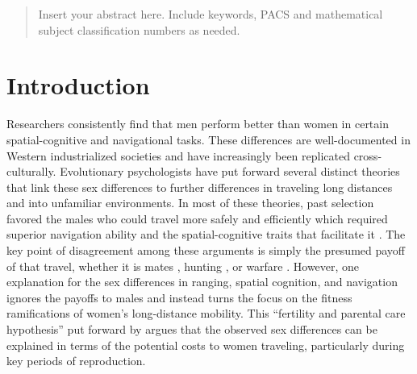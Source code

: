 
\date{Received: date / Accepted: date}


\maketitle

\begin{abstract}
Insert your abstract here. Include keywords, PACS and mathematical
subject classification numbers as needed.
\end{abstract}

\section{Introduction}
\label{sec:1}
Researchers consistently find  that men perform better than women in certain spatial-cognitive and navigational tasks.  These differences are well-documented in Western industrialized societies and have increasingly been replicated cross-culturally.  Evolutionary psychologists have put forward several distinct theories that link these sex differences to further differences in traveling long distances and into unfamiliar environments.  In most of these theories, past selection favored the males who could travel more safely and efficiently which required superior navigation ability and the spatial-cognitive traits that facilitate it \citep{gray1971sex}.  The key point of disagreement among these arguments is simply the presumed payoff of that travel, whether it is mates \citep{gaulin1992evolution}, hunting \citep{eals1994hunter}, or warfare \citep{geary1995sexual}.  However, one explanation for the sex differences in ranging, spatial cognition, and navigation ignores the payoffs to males and instead turns the focus on the fitness ramifications of women's long-distance mobility.  This ``fertility and parental care hypothesis'' put forward by \citet{sherry1997evolution} argues that the observed sex differences can be explained in terms of the potential costs to women traveling, particularly during key periods of reproduction.

